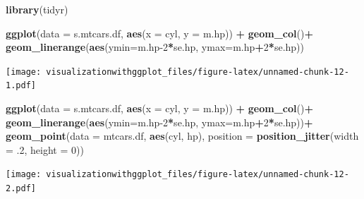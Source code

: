 \documentclass[]{krantz}
\makeatletter
\newenvironment{Shaded}{\begin{snugshade}}{\end{snugshade}}
\newcommand{\DataTypeTok}[1]{\textcolor[rgb]{0.13,0.29,0.53}{#1}}
\newcommand{\DecValTok}[1]{\textcolor[rgb]{0.00,0.00,0.81}{#1}}
\newcommand{\FloatTok}[1]{\textcolor[rgb]{0.00,0.00,0.81}{#1}}
\newcommand{\KeywordTok}[1]{\textcolor[rgb]{0.13,0.29,0.53}{\textbf{#1}}}
\newcommand{\NormalTok}[1]{#1}
\newcommand{\OperatorTok}[1]{\textcolor[rgb]{0.81,0.36,0.00}{\textbf{#1}}}
\newcommand{\StringTok}[1]{\textcolor[rgb]{0.31,0.60,0.02}{#1}}
\newenvironment{kframe}{%
\medskip{}
\setlength{\fboxsep}{.8em}
 \def\at@end@of@kframe{}%
 \ifinner\ifhmode%
  \def\at@end@of@kframe{\end{minipage}}%
  \begin{minipage}{\columnwidth}%
 \fi\fi%
 \def\FrameCommand##1{\hskip\@totalleftmargin \hskip-\fboxsep
 \colorbox{shadecolor}{##1}\hskip-\fboxsep
     \hskip-\linewidth \hskip-\@totalleftmargin \hskip\columnwidth}%
 \MakeFramed {\advance\hsize-\width
   \@totalleftmargin\z@ \linewidth\hsize
   \@setminipage}}%
 {\par\unskip\endMakeFramed%
 \at@end@of@kframe}
\renewenvironment{Shaded}{\begin{kframe}}{\end{kframe}}
\makeatother
\begin{document}
\begin{Shaded}
\begin{Highlighting}[]
\KeywordTok{library}\NormalTok{(tidyr)}

\KeywordTok{ggplot}\NormalTok{(}\DataTypeTok{data =}\NormalTok{ s.mtcars.df, }\KeywordTok{aes}\NormalTok{(}\DataTypeTok{x =}\NormalTok{ cyl, }\DataTypeTok{y =}\NormalTok{ m.hp)) }\OperatorTok{+}
\StringTok{  }\KeywordTok{geom_col}\NormalTok{()}\OperatorTok{+}
\StringTok{  }\KeywordTok{geom_linerange}\NormalTok{(}\KeywordTok{aes}\NormalTok{(}\DataTypeTok{ymin=}\NormalTok{m.hp}\DecValTok{-2}\OperatorTok{*}\NormalTok{se.hp, }\DataTypeTok{ymax=}\NormalTok{m.hp}\OperatorTok{+}\DecValTok{2}\OperatorTok{*}\NormalTok{se.hp))}
\end{Highlighting}
\end{Shaded}

\texttt{[image: visualizationwithggplot\_files/figure-latex/unnamed-chunk-12-1.pdf]}

\begin{Shaded}
\begin{Highlighting}[]
\KeywordTok{ggplot}\NormalTok{(}\DataTypeTok{data =}\NormalTok{ s.mtcars.df, }\KeywordTok{aes}\NormalTok{(}\DataTypeTok{x =}\NormalTok{ cyl, }\DataTypeTok{y =}\NormalTok{ m.hp)) }\OperatorTok{+}
\StringTok{  }\KeywordTok{geom_col}\NormalTok{()}\OperatorTok{+}
\StringTok{  }\KeywordTok{geom_linerange}\NormalTok{(}\KeywordTok{aes}\NormalTok{(}\DataTypeTok{ymin=}\NormalTok{m.hp}\DecValTok{-2}\OperatorTok{*}\NormalTok{se.hp, }\DataTypeTok{ymax=}\NormalTok{m.hp}\OperatorTok{+}\DecValTok{2}\OperatorTok{*}\NormalTok{se.hp))}\OperatorTok{+}
\StringTok{  }\KeywordTok{geom_point}\NormalTok{(}\DataTypeTok{data =}\NormalTok{ mtcars.df, }\KeywordTok{aes}\NormalTok{(cyl, hp), }\DataTypeTok{position =} \KeywordTok{position_jitter}\NormalTok{(}\DataTypeTok{width =} \FloatTok{.2}\NormalTok{, }\DataTypeTok{height =} \DecValTok{0}\NormalTok{))}
\end{Highlighting}
\end{Shaded}

\texttt{[image: visualizationwithggplot\_files/figure-latex/unnamed-chunk-12-2.pdf]}
\end{document}

